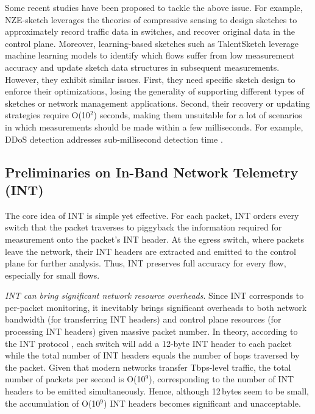 Some recent studies have been proposed to tackle the above issue. For example, NZE-sketch \cite{huang2021toward} leverages the theories of compressive sensing to design sketches to approximately record traffic data in switches, and recover original data in the control plane. Moreover, learning-based sketches such as TalentSketch \cite{li2024learning} leverage machine learning models to identify which flows suffer from low measurement accuracy and update sketch data structures in subsequent measurements. However, they exhibit similar issues. First, they need specific sketch design to enforce their optimizations, losing the generality of supporting different types of sketches or network management applications. Second, their recovery or updating strategies require O(10$^2$) seconds, making them unsuitable for a lot of scenarios in which measurements should be made within a few milliseconds. For example, DDoS detection addresses sub-millisecond detection time \cite{liu2021jaqen}. 

\subsection{Preliminaries on In-Band Network Telemetry (INT)}\label{int}

The core idea of INT is simple yet effective. For each packet, INT orders every switch that the packet traverses to piggyback the information required for measurement onto the packet's INT header. At the egress switch, where packets leave the network, their INT headers are extracted and emitted to the control plane for further analysis. Thus, INT preserves full accuracy for every flow, especially for small flows. 

 \emph{INT can bring significant network resource overheads}. Since INT corresponds to per-packet monitoring, it inevitably brings significant overheads to both network bandwidth (for transferring INT headers) and control plane resources (for processing INT headers) given massive packet number. In theory, according to the INT protocol \cite{int}, each switch will add a 12-byte INT header to each packet while the total number of INT headers equals the number of hops traversed by the packet. Given that modern networks transfer Tbps-level traffic, the total number of packets per second is O(10$^9$), corresponding to the number of INT headers to be emitted simultaneously. Hence, although 12\,bytes seem to be small, the accumulation of O(10$^9$) INT headers becomes significant and unacceptable. 

